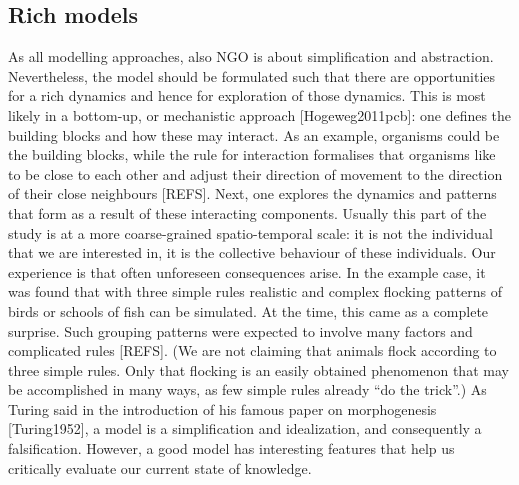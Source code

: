 \subsection{Rich models}

As all modelling approaches, also NGO is about simplification and abstraction. Nevertheless, the model should be formulated such that there are opportunities for a rich dynamics and hence for exploration of those dynamics. This is most likely in a bottom-up, or mechanistic approach [Hogeweg2011pcb]: one defines the building blocks and how these may interact. As an example, organisms could be the building blocks, while the rule for interaction formalises that organisms like to be close to each other and adjust their direction of movement to the direction of their close neighbours [REFS]. Next, one explores the dynamics and patterns that form as a result of these interacting components. Usually this part of the study is at a more coarse-grained spatio-temporal scale: it is not the individual that we are interested in, it is the collective behaviour of these individuals. Our experience is that often unforeseen consequences arise. In the example case, it was found that with three simple rules realistic and complex flocking patterns of birds or schools of fish can be simulated. At the time, this came as a complete surprise. Such grouping patterns were expected to involve many factors and complicated rules [REFS]. (We are not claiming that animals flock according to three simple rules. Only that flocking is an easily obtained phenomenon that may be accomplished in many ways, as few simple rules already ``do the trick''.) As Turing said in the introduction of his famous paper on morphogenesis [Turing1952], a model is a simplification and idealization, and consequently a falsification. However, a good model has interesting features that help us critically evaluate our current state of knowledge.